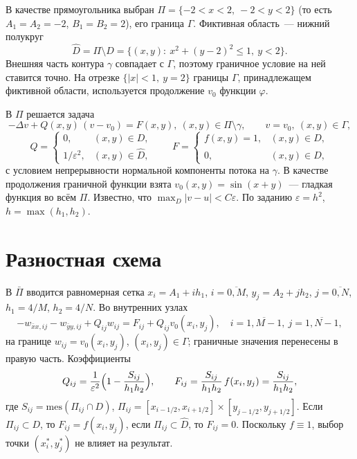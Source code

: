\documentclass[12pt,a4paper]{article}
\newcommand{\eps}{\varepsilon}
\begin{document}
В качестве прямоугольника выбран $\Pi=\{-2<x<2,\ -2<y<2\}$ (то есть $A_1=A_2=-2$,
$B_1=B_2=2$), его граница $\Gamma$. Фиктивная область~--- нижний полукруг
\[
\hat D=\Pi\setminus D=\{(x,y):\ x^2+(y-2)^2\le1,\ y<2\}.
\]
Внешняя часть контура $\gamma$ совпадает с $\Gamma$, поэтому граничное условие на ней
ставится точно. На отрезке $\{|x|<1,\ y=2\}$ границы $\Gamma$, принадлежащем фиктивной области,
используется продолжение $v_0$ функции $\varphi$.

В $\Pi$ решается задача
\begin{equation}\label{eq:fict}
-\Delta v + Q(x,y)\,(v-v_0)=F(x,y),\ (x,y)\in\Pi\setminus\gamma,\qquad v=v_0,\ (x,y)\in\Gamma,
\end{equation}
\[
Q=\begin{cases}0,&(x,y)\in D,\\ 1/\eps^2,&(x,y)\in\hat D,\end{cases}\qquad
F=\begin{cases}f(x,y)=1,&(x,y)\in D,\\ 0,&(x,y)\in\hat D,\end{cases}
\]
с условием непрерывности нормальной компоненты потока на $\gamma$. В качестве продолжения
граничной функции взята $v_0(x,y)=\sin(x+y)$~--- гладкая функция во всём $\Pi$.
Известно, что $\max_D|v-u|<C\eps$. По заданию $\eps=h^2$, $h=\max(h_1,h_2)$.

\section{Разностная схема}

В $\bar\Pi$ вводится равномерная сетка $x_i=A_1+ih_1$, $i=\overline{0,M}$, $y_j=A_2+jh_2$,
$j=\overline{0,N}$, $h_1=4/M$, $h_2=4/N$. Во внутренних узлах
\begin{equation}\label{eq:scheme}
-w_{\bar xx,ij}-w_{\bar yy,ij}+Q_{ij}w_{ij}=F_{ij}+Q_{ij}v_0(x_i,y_j),\quad i=\overline{1,M-1},\ j=\overline{1,N-1},
\end{equation}
на границе $w_{ij}=v_0(x_i,y_j)$, $(x_i,y_j)\in\Gamma$; граничные значения перенесены в правую часть.
Коэффициенты
\[
Q_{ij}=\frac{1}{\eps^2}\Bigl(1-\frac{S_{ij}}{h_1h_2}\Bigr),\qquad
F_{ij}=\frac{S_{ij}}{h_1h_2}\,f(x_i,y_j)=\frac{S_{ij}}{h_1h_2},
\]
где $S_{ij}=\mathrm{mes}(\Pi_{ij}\cap D)$, $\Pi_{ij}=[x_{i-1/2},x_{i+1/2}]\times[y_{j-1/2},y_{j+1/2}]$.
Если $\Pi_{ij}\subset D$, то $F_{ij}=f(x_i,y_j)$, если $\Pi_{ij}\subset\hat D$, то $F_{ij}=0$.
Поскольку $f\equiv1$, выбор точки $(x_i^*,y_j^*)$ не влияет на результат.
\end{document}
